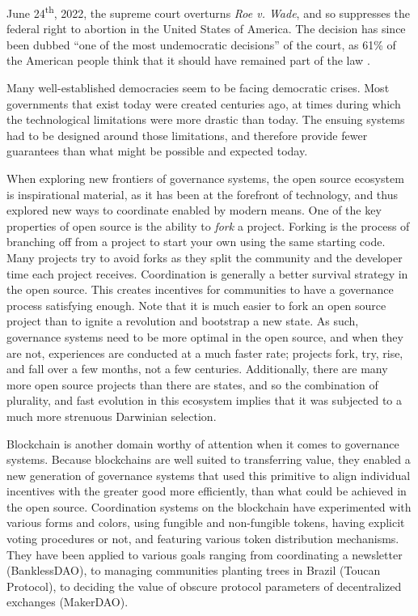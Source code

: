 \leavevmode{}June 24\textsuperscript{th}, 2022, the supreme court overturns \textit{Roe v. Wade}, and so suppresses the federal right to abortion in the United States of America.
The decision has since been dubbed \enquote{one of the most undemocratic decisions} of the court, as 61\% of the American people think that it should have remained part of the law \cite{smith_mockery_2022}.

\leavevmode{}Many well-established democracies seem to be facing democratic crises.
Most governments that exist today were created centuries ago, at times during which the technological limitations were more drastic than today.
The ensuing systems had to be designed around those limitations, and therefore provide fewer guarantees than what might be possible and expected today.

\leavevmode{}When exploring new frontiers of governance systems, the open source ecosystem is inspirational material, as it has been at the forefront of technology, and thus explored new ways to coordinate enabled by modern means.
One of the key properties of open source is the ability to \textit{fork} a project.
Forking is the process of branching off from a project to start your own using the same starting code.
Many projects try to avoid forks as they split the community and the developer time each project receives.
Coordination is generally a better survival strategy in the open source.
This creates incentives for communities to have a governance process satisfying enough.
Note that it is much easier to fork an open source project than to ignite a revolution and bootstrap a new state.
As such, governance systems need to be more optimal in the open source, and when they are not, experiences are conducted at a much faster rate; projects fork, try, rise, and fall over a few months, not a few centuries.
Additionally, there are many more open source projects than there are states, and so the combination of plurality, and fast evolution in this ecosystem implies that it was subjected to a much more strenuous Darwinian selection.

\leavevmode{}Blockchain is another domain worthy of attention when it comes to governance systems.
Because blockchains are well suited to transferring value, they enabled a new generation of governance systems that used this primitive to align individual incentives with the greater good more efficiently, than what could be achieved in the open source.
Coordination systems on the blockchain have experimented with various forms and colors, using fungible and non-fungible tokens, having explicit voting procedures or not, and featuring various token distribution mechanisms.
They have been applied to various goals ranging from coordinating a newsletter (BanklessDAO), to managing communities planting trees in Brazil (Toucan Protocol), to deciding the value of obscure protocol parameters of decentralized exchanges (MakerDAO).

